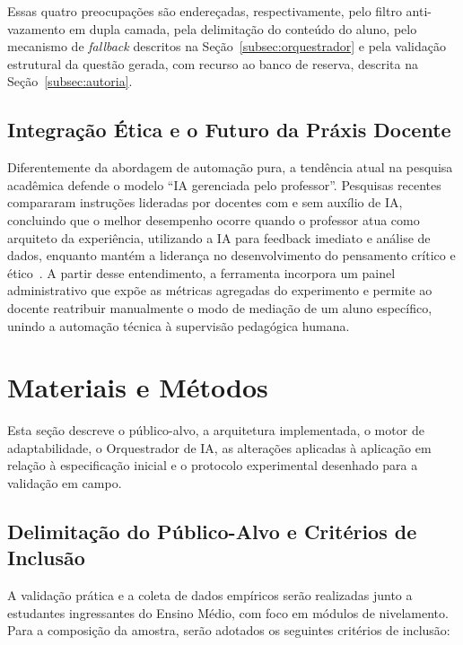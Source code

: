 \documentclass[10pt, a4paper, twocolumn]{article}
\begin{document}
Essas quatro preocupações são endereçadas, respectivamente, pelo filtro
anti-vazamento em dupla camada, pela delimitação do conteúdo do aluno, pelo
mecanismo de \textit{fallback} descritos na Seção~\ref{subsec:orquestrador} e
pela validação estrutural da questão gerada, com recurso ao banco de reserva,
descrita na Seção~\ref{subsec:autoria}.

\subsection{Integração Ética e o Futuro da Práxis Docente}

Diferentemente da abordagem de automação pura, a tendência atual na pesquisa
acadêmica defende o modelo ``IA gerenciada pelo professor''. Pesquisas recentes
compararam instruções lideradas por docentes com e sem auxílio de IA, concluindo
que o melhor desempenho ocorre quando o professor atua como arquiteto da
experiência, utilizando a IA para feedback imediato e análise de dados, enquanto
mantém a liderança no desenvolvimento do pensamento crítico e
ético~\cite{luckin2018}. A partir desse entendimento, a ferramenta incorpora um
painel administrativo que expõe as métricas agregadas do experimento e permite ao
docente reatribuir manualmente o modo de mediação de um aluno específico,
unindo a automação técnica à supervisão pedagógica humana.

\section{Materiais e Métodos}
\label{sec:metodologia}

Esta seção descreve o público-alvo, a arquitetura implementada, o motor de
adaptabilidade, o Orquestrador de IA, as alterações aplicadas à aplicação em
relação à especificação inicial e o protocolo experimental desenhado para a
validação em campo.

\subsection{Delimitação do Público-Alvo e Critérios de Inclusão}
\label{subsec:publico_alvo}

A validação prática e a coleta de dados empíricos serão realizadas junto a
estudantes ingressantes do Ensino Médio, com foco em módulos de nivelamento.
Para a composição da amostra, serão adotados os seguintes critérios de inclusão:
\end{document}
